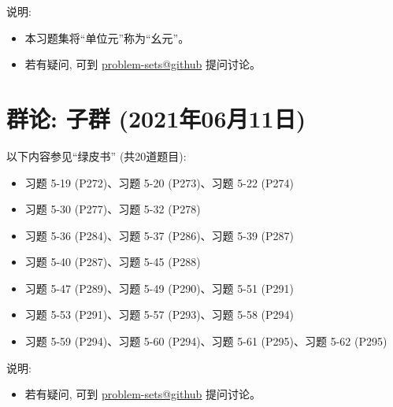 \documentclass{article}
\begin{document}
说明:
\begin{itemize}
  \item 本习题集将``单位元''称为``幺元''。
  \item 若有疑问, 可到 \href{https://github.com/courses-at-nju-by-hfwei/discrete-math-problem-sets/discussions}{problem-sets@github} 提问讨论。
\end{itemize}
\section{群论: 子群 (2021年06月11日)}

以下内容参见``绿皮书'' (共20道题目):
\begin{itemize}
  \item 习题 5-19 (P272)、习题 5-20 (P273)、习题 5-22 (P274)
  \item 习题 5-30 (P277)、习题 5-32 (P278)
  \item 习题 5-36 (P284)、习题 5-37 (P286)、习题 5-39 (P287)
  \item 习题 5-40 (P287)、习题 5-45 (P288)
  \item 习题 5-47 (P289)、习题 5-49 (P290)、习题 5-51 (P291)
  \item 习题 5-53 (P291)、习题 5-57 (P293)、习题 5-58 (P294)
  \item 习题 5-59 (P294)、习题 5-60 (P294)、习题 5-61 (P295)、习题 5-62 (P295)
\end{itemize}

说明:
\begin{itemize}
  \item 若有疑问, 可到 \href{https://github.com/courses-at-nju-by-hfwei/discrete-math-problem-sets/discussions}{problem-sets@github} 提问讨论。
\end{itemize}
\end{document}
